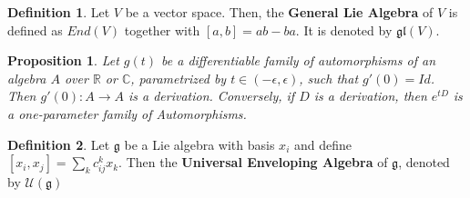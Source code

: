 \documentclass[a4paper]{article}
\theoremstyle{theorem}
\newtheorem{proposition}[theorem]{Proposition}
\theoremstyle{definition}
\newtheorem{definition}{Definition} [section]
\theoremstyle{remark}
\theoremstyle{gremark}
\theoremstyle{discussion}
\theoremstyle{notation}
\begin{document}
	\begin{definition}
		Let $V$ be a vector space. Then, the \textbf{General Lie Algebra} of $V$ is defined as $End(V)$ together with $[a,b]=ab-ba$. It is denoted by $\mathfrak{gl}(V)$.
	\end{definition}
	
	\begin{proposition}
		Let $g(t)$ be a differentiable family of automorphisms of an algebra $A$ over $\mathbb{R}$ or $\mathbb{C}$, parametrized by $t\in(-\epsilon,\epsilon)$, such that $g'(0)=Id$. Then $g'(0):A\to A$ is a derivation. Conversely, if $D$ is a derivation, then $e^{tD}$ is a one-parameter family of Automorphisms.
	\end{proposition}

	\begin{definition}
		Let $\mathfrak{g}$ be a Lie algebra with basis $x_i$ and define $[x_i,x_j]=\sum_k c_{ij}^k x_k$. Then the \textbf{Universal Enveloping Algebra} of $\mathfrak{g}$, denoted by $\mathcal{U}(\mathfrak{g})$
	\end{definition}
	

	
	
\end{document}
